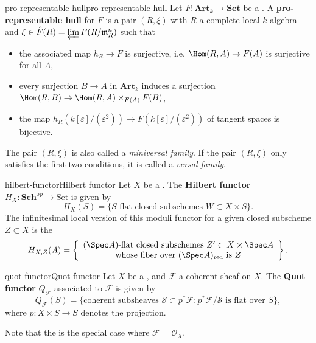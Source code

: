 \begin{topic}{pro-representable-hull}{pro-representable hull}
    Let $F : \textbf{Art}_k \to \textbf{Set}$ be a .
    A \textbf{pro-representable hull} for $F$ is a pair $(R, \xi)$ with $R$ a complete local $k$-algebra and $\xi \in \hat{F}(R) = \varprojlim F(R / \mathfrak{m}_R^n)$ such that
    \begin{itemize}
        \item the associated map $h_R \to F$ is surjective, i.e. $\Hom(R, A) \to F(A)$ is surjective for all $A$,
        \item every surjection $B \to A$ in $\textbf{Art}_k$ induces a surjection $\Hom(R, B) \to \Hom(R, A) \times_{F(A)} F(B)$,
        \item the map $h_R(k[\varepsilon]/(\varepsilon^2)) \to F(k[\varepsilon]/(\varepsilon^2))$ of tangent spaces is bijective.
    \end{itemize}
    The pair $(R, \xi)$ is also called a \textit{miniversal family}. If the pair $(R, \xi)$ only satisfies the first two conditions, it is called a \textit{versal family}.
\end{topic}

\begin{topic}{hilbert-functor}{Hilbert functor}
    Let $X$ be a . The \textbf{Hilbert functor} $H_X : \textbf{Sch}^\text{op} \to \text{Set}$ is given by
    \[ H_X(S) = \{ \text{$S$-flat closed subschemes $W \subset X \times S$} \} . \]
    The infinitesimal local version of this moduli functor for a given closed subscheme $Z \subset X$ is the 
    \[ H_{X, Z}(A) = \left\{ \begin{array}{cc} \text{$(\Spec A)$-flat closed subschemes $Z' \subset X \times \Spec A$} \\ \text{whose fiber over $(\Spec A)_\text{red}$ is $Z$} \end{array} \right\} . \]
\end{topic}

\begin{topic}{quot-functor}{Quot functor}
    Let $X$ be a , and $\mathcal{F}$ a coherent sheaf on $X$. The \textbf{Quot functor} $Q_\mathcal{F}$ associated to $\mathcal{F}$ is given by
    \[ Q_\mathcal{F}(S) = \{ \text{coherent subsheaves } \mathcal{S} \subset p^* \mathcal{F} : p^* \mathcal{F} / \mathcal{S} \text{ is flat over } S \} , \]
    where $p : X \times S \to S$ denotes the projection.
    
    Note that the  is the special case where $\mathcal{F} = \mathcal{O}_X$.
\end{topic}
